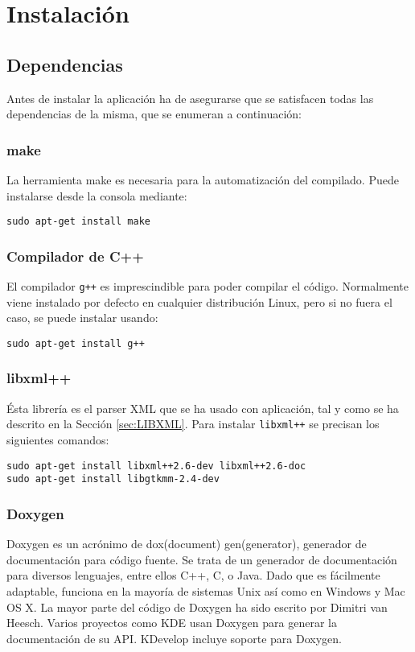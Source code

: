 \section{Instalación}
\subsection{Dependencias}
Antes de instalar la aplicación ha de asegurarse que se satisfacen todas las dependencias
de la misma, que se enumeran a continuación:
\subsubsection{make}
La herramienta make es necesaria para la automatización del compilado. Puede
instalarse desde la consola mediante:
\begin{lstlisting}[numbers=none]
sudo apt-get install make
\end{lstlisting}

\subsubsection{Compilador de C++}
El compilador \texttt{g++} es imprescindible para poder compilar el código.
Normalmente viene instalado por defecto en cualquier distribución Linux, pero si no fuera el caso, se puede
instalar usando:
\begin{lstlisting}[numbers=none]
sudo apt-get install g++
\end{lstlisting}
\subsubsection{libxml++}
Ésta librería es el parser XML que se ha usado con aplicación, tal y como se ha descrito en 
la Sección \ref{sec:LIBXML}. 
Para instalar \texttt{libxml++} se precisan los siguientes comandos:
\begin{lstlisting}[numbers=none]
sudo apt-get install libxml++2.6-dev libxml++2.6-doc
sudo apt-get install libgtkmm-2.4-dev
\end{lstlisting}
\subsubsection{Doxygen}
Doxygen \cite{Web:DOX} es un acrónimo de dox(document) gen(generator), generador de
documentación para código fuente.
Se trata de un generador de documentación para diversos lenguajes, entre ellos C++, C, o Java.
Dado que es fácilmente adaptable, funciona en la mayoría de
sistemas Unix así como en Windows y Mac OS X. 
La mayor parte del código de Doxygen ha sido escrito por Dimitri van Heesch.
Varios proyectos como KDE usan Doxygen para generar la documentación de su API.
KDevelop incluye soporte para Doxygen.

